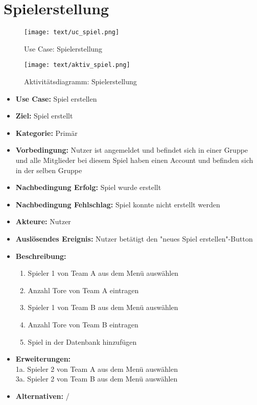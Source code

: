 \section{Spielerstellung}
\begin{figure}[h!]
	\centering
	\texttt{[image: text/uc\_spiel.png]}
	\caption{Use Case: Spielerstellung}
	\label{uc_spiel}
\end{figure}
\begin{figure}[h!]
	\centering
	\texttt{[image: text/aktiv\_spiel.png]}
	\caption{Aktivitätsdiagramm: Spielerstellung}
	\label{aktiv_spiel}
\end{figure}
\begin{itemize}
	\item \textbf{Use Case:} Spiel erstellen
	\item \textbf{Ziel:} Spiel erstellt
	\item \textbf{Kategorie:} Primär
	\item \textbf{Vorbedingung:} Nutzer ist angemeldet und befindet sich in einer Gruppe und alle Mitglieder bei diesem Spiel haben einen Account und befinden sich in der selben Gruppe
	\item \textbf{Nachbedingung Erfolg:} Spiel wurde erstellt
	\item \textbf{Nachbedingung Fehlschlag:} Spiel konnte nicht erstellt werden
	\item \textbf{Akteure:} Nutzer
	\item \textbf{Auslösendes Ereignis:} Nutzer betätigt den "neues Spiel erstellen"-Button
	\item \textbf{Beschreibung:} \begin{enumerate}
		\item Spieler 1 von Team A aus dem Menü auswählen
		\item Anzahl Tore von Team A eintragen
		\item Spieler 1 von Team B aus dem Menü auswählen
		\item Anzahl Tore von Team B eintragen
		\item Spiel in der Datenbank hinzufügen
	\end{enumerate}
	\item \textbf{Erweiterungen:} \\1a. Spieler 2 von Team A aus dem Menü auswählen\\
	3a. Spieler 2 von Team B aus dem Menü auswählen
	\item \textbf{Alternativen:} /
\end{itemize}

